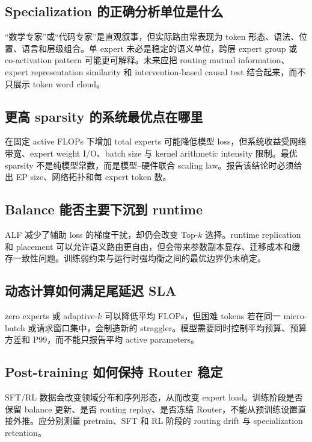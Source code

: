 \documentclass[10pt,a4paper,fontset=none]{ctexart}
\begin{document}
\subsection{Specialization 的正确分析单位是什么}

“数学专家”或“代码专家”是直观叙事，但实际路由常表现为 token 形态、语法、位置、语言和层级组合。单 expert 未必是稳定的语义单位，跨层 expert group 或 co-activation pattern 可能更可解释。未来应把 routing mutual information、expert representation similarity 和 intervention-based causal test 结合起来，而不只展示 token word cloud。

\subsection{更高 sparsity 的系统最优点在哪里}

在固定 active FLOPs 下增加 total experts 可能降低模型 loss，但系统收益受网络带宽、expert weight I/O、batch size 与 kernel arithmetic intensity 限制。最优 sparsity 不是纯模型常数，而是模型--硬件联合 scaling law。报告该结论时必须给出 EP size、网络拓扑和每 expert token 数。

\subsection{Balance 能否主要下沉到 runtime}

ALF 减少了辅助 loss 的梯度干扰，却仍会改变 Top-$k$ 选择。runtime replication 和 placement 可以允许语义路由更自由，但会带来参数副本显存、迁移成本和缓存一致性问题。训练弱约束与运行时强均衡之间的最优边界仍未确定。

\subsection{动态计算如何满足尾延迟 SLA}

zero experts 或 adaptive-$k$ 可以降低平均 FLOPs，但困难 tokens 若在同一 micro-batch 或请求窗口集中，会制造新的 straggler。模型需要同时控制平均预算、预算方差和 P99，而不能只报告平均 active parameters。

\subsection{Post-training 如何保持 Router 稳定}

SFT/RL 数据会改变领域分布和序列形态，从而改变 expert load。训练阶段是否保留 balance 更新、是否 routing replay、是否冻结 Router，不能从预训练设置直接外推。应分别测量 pretrain、SFT 和 RL 阶段的 routing drift 与 specialization retention。
\end{document}
